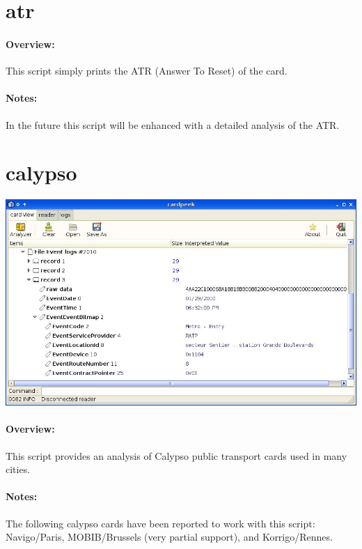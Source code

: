 \documentclass[11pt]{report}
\begin{document}
\section{atr}

\paragraph{Overview:}
This script simply prints the ATR (Answer To Reset) of the card.

\paragraph{Notes:}
In the future this script will be enhanced with a detailed analysis of the ATR.

\section{calypso}

\begin{center}
\includegraphics[width=1\textwidth]{graphics/sample-navigo.jpg}
\end{center}

\paragraph{Overview:}
This script provides an analysis of Calypso public transport cards used in many cities.

\paragraph{Notes:}
The following calypso cards have been reported to work with this script: Navigo/Paris,
MOBIB/Brussels (very partial support), and Korrigo/Rennes. 
\end{document}
